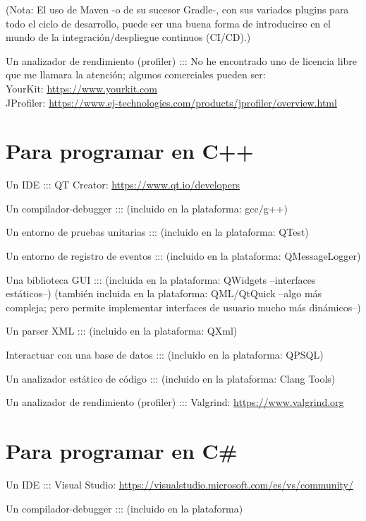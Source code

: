 \documentclass[spanish,12pt,a4paper,final,oneside]{book}
\begin{document}
\begin{footnotesize}
(Nota: El uso de Maven -o de su sucesor Gradle-, con sus variados plugins para todo el ciclo de desarrollo, puede ser una buena forma de introducirse en el mundo de la integración/despliegue continuos (CI/CD).)
\end{footnotesize}

Un analizador de rendimiento (profiler) ::: No he encontrado uno de licencia libre que me llamara la atención; algunos comerciales pueden ser: 
\\YourKit: \url{https://www.yourkit.com}  
\\JProfiler: \url{https://www.ej-technologies.com/products/jprofiler/overview.html}

\section{Para programar en C++}

Un IDE ::: QT Creator: \url{https://www.qt.io/developers}  

Un compilador-debugger ::: (incluido en la plataforma: gcc/g++)

Un entorno de pruebas unitarias ::: (incluido en la plataforma: QTest)

Un entorno de registro de eventos ::: (incluido en la plataforma: QMessageLogger)

Una biblioteca GUI ::: (incluida en la plataforma: QWidgets --interfaces estáticos--) (también incluida en la plataforma: QML/QtQuick --algo más compleja; pero permite implementar interfaces de usuario mucho más dinámicos--)

Un parser XML ::: (incluido en la plataforma: QXml)

Interactuar con una base de datos ::: (incluido en la plataforma: QPSQL) 

Un analizador estático de código ::: (incluido en la plataforma: Clang Tools)

Un analizador de rendimiento (profiler) ::: Valgrind: \url{https://www.valgrind.org} 

\section{Para programar en C\#}

Un IDE ::: Visual Studio: \url{https://visualstudio.microsoft.com/es/vs/community/} 

Un compilador-debugger ::: (incluido en la plataforma)
\end{document}
